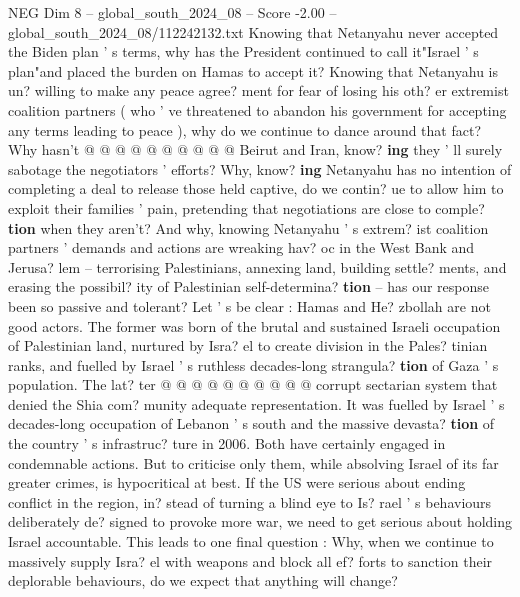\begin{textsample}{NEG Dim 8 – global\_south\_2024\_08 – Score -2.00 – global\_south\_2024\_08/112242132.txt}
Knowing that Netanyahu never accepted the Biden plan ' s terms, why has the President continued to call it"Israel ' s plan"and placed the burden on Hamas to accept it?
Knowing that Netanyahu is un? willing to make any peace agree? ment for fear of losing his oth? er extremist coalition partners ( who ' ve threatened to abandon his government for accepting any terms leading to peace ), why do we continue to dance around that fact?
Why hasn't @ @ @ @ @ @ @ @ @ @ Beirut and Iran, know? \textbf{ing} they ' ll surely sabotage the negotiators ' efforts?
Why, know? \textbf{ing} Netanyahu has no intention of completing a deal to release those held captive, do we contin? ue to allow him to exploit their families ' pain, pretending that negotiations are close to comple? \textbf{tion} when they aren't?
And why, knowing Netanyahu ' s extrem? ist coalition partners ' demands and actions are wreaking hav? oc in the West Bank and Jerusa? lem -- terrorising Palestinians, annexing land, building settle? ments, and erasing the possibil? ity of Palestinian self-determina? \textbf{tion} -- has our response been so passive and tolerant?
Let ' s be clear : Hamas and He? zbollah are not good actors.
The former was born of the brutal and sustained Israeli occupation of Palestinian land, nurtured by Isra? el to create division in the Pales? tinian ranks, and fuelled by Israel ' s ruthless decades-long strangula? \textbf{tion} of Gaza ' s population.
The lat? ter @ @ @ @ @ @ @ @ @ @ corrupt sectarian system that denied the Shia com? munity adequate representation.
It was fuelled by Israel ' s decades-long occupation of Lebanon ' s south and the massive devasta? \textbf{tion} of the country ' s infrastruc? ture in 2006.
Both have certainly engaged in condemnable actions.
But to criticise only them, while absolving Israel of its far greater crimes, is hypocritical at best.
If the US were serious about ending conflict in the region, in? stead of turning a blind eye to Is? rael ' s behaviours deliberately de? signed to provoke more war, we need to get serious about holding Israel accountable.
This leads to one final question : Why, when we continue to massively supply Isra? el with weapons and block all ef? forts to sanction their deplorable behaviours, do we expect that anything will change?

\end{textsample}
